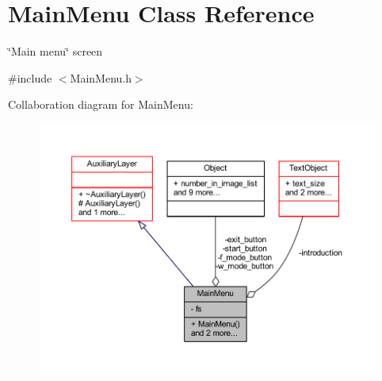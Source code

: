 \hypertarget{class_main_menu}{}\section{Main\+Menu Class Reference}
\label{class_main_menu}


\char`\"{}\+Main menu\char`\"{} screen  




{\ttfamily \#include $<$Main\+Menu.\+h$>$}



Collaboration diagram for Main\+Menu\+:
\nopagebreak
\begin{figure}[H]
\begin{center}
\leavevmode
\includegraphics[width=350pt]{class_main_menu__coll__graph}
\end{center}
\end{figure}
